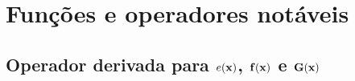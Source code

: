 
\chapter{Funções e operadores notáveis}

\section{Operador derivada para $e(\VECTOR{x})$, $\VECTOR{f}(\VECTOR{x})$ e  $\MATRIX{G}(\VECTOR{x})$}

